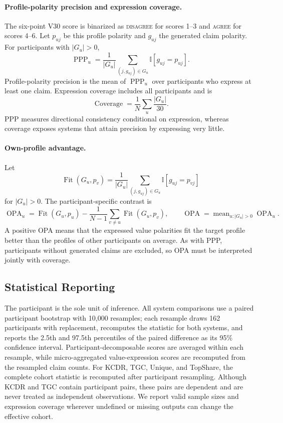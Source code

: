 \paragraph{Profile-polarity precision and expression coverage.}
The six-point V30 score is binarized as \textsc{disagree} for scores 1--3 and
\textsc{agree} for scores 4--6. Let \(p_{uj}\) be this profile polarity and
\(g_{uj}\) the generated claim polarity. For participants with
\(|G_u|>0\),
\begin{equation}
\operatorname{PPP}_u
=\frac{1}{|G_u|}\sum_{(j,g_{uj})\in G_u}\mathbb I[g_{uj}=p_{uj}].
\label{eq:profile_polarity_precision}
\end{equation}
Profile-polarity precision is the mean of \(\operatorname{PPP}_u\) over
participants who express at least one claim. Expression coverage includes
all participants and is
\begin{equation}
\operatorname{Coverage}=\frac{1}{N}\sum_u\frac{|G_u|}{30}.
\label{eq:expression_coverage}
\end{equation}
PPP measures directional consistency conditional on expression, whereas
coverage exposes systems that attain precision by expressing very little.

\paragraph{Own-profile advantage.}
Let
\[
\operatorname{Fit}(G_u,p_v)
=\frac{1}{|G_u|}\sum_{(j,g_{uj})\in G_u}\mathbb I[g_{uj}=p_{vj}]
\]
for \(|G_u|>0\). The participant-specific contrast is
\begin{equation}
\operatorname{OPA}_u
=\operatorname{Fit}(G_u,p_u)
-\frac{1}{N-1}\sum_{v\ne u}\operatorname{Fit}(G_u,p_v),
\qquad
\operatorname{OPA}=\operatorname{mean}_{u:|G_u|>0}\operatorname{OPA}_u .
\label{eq:own_profile_advantage}
\end{equation}
A positive OPA means that the expressed value polarities fit the target
profile better than the profiles of other participants on average. As with
PPP, participants without generated claims are excluded, so OPA must be
interpreted jointly with coverage.

\subsection{Statistical Reporting}

The participant is the sole unit of inference. All system comparisons use a
paired participant bootstrap with 10,000 resamples; each resample draws 162
participants with replacement, recomputes the statistic for both systems,
and reports the 2.5th and 97.5th percentiles of the paired difference as its
95\% confidence interval. Participant-decomposable scores are averaged within
each resample, while micro-aggregated value-expression scores are recomputed
from the resampled claim counts. For KCDR, TGC, Unique, and TopShare, the
complete cohort statistic is recomputed after participant resampling.
Although KCDR and TGC contain participant pairs, these pairs are dependent
and are never treated as independent observations. We report valid sample
sizes and expression coverage wherever undefined or missing outputs can
change the effective cohort.
